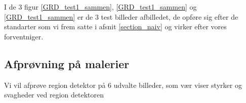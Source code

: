 \begin{figure}[!h]
    \centering
		\hspace{1em}
    	\hspace{1em}
        \caption[]{}
     \label{GRD_test3_sammen}
\end{figure}

I de 3 figur \ref{GRD_test1_sammen}, \ref{GRD_test1_sammen} og
\ref{GRD_test1_sammen} er de 3 test billeder afbilledet, de opføre sig
efter de standarter som vi frem satte i afsnit \ref{section_naiv} og
virker efter vores forventniger.

\subsection{Afprøvning på malerier}
Vi vil afprøve region detektor på 6 udvalte billeder, som vær viser
styrker og svagheder ved region detektoren

